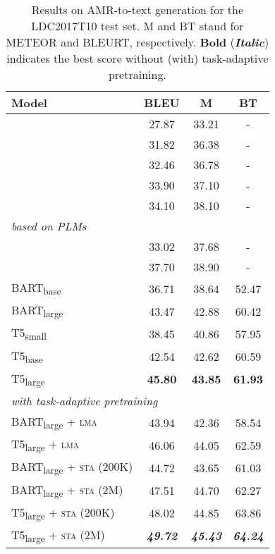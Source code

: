 \documentclass[11pt]{article}
\begin{document}
\begin{table}[t]
\centering
{\renewcommand{\arraystretch}{0.6}
\begin{tabular}{@{\hspace*{1mm}}l@{\hspace*{1mm}}ccc@{\hspace*{1mm}}}  
\toprule
\textbf{Model} & \textbf{BLEU} & \textbf{M} & \textbf{BT}  \\
\midrule
\citet{ribeiro-etal-2019-enhancing}  & 27.87 & 33.21 & -\\
\citet{zhu-etal-2019-modeling} & 31.82 & 36.38 & -\\
\citet{zhao-etal-2020-line} & 32.46 & 36.78 & -\\
\citet{doi:10.116200297} & 33.90 & 37.10 &  -\\
\citet{yao-etal-2020-heterogeneous}  & 34.10 & 38.10 & -\\
\midrule
\small{\textit{based on PLMs}} & & & \\[.2em]
\citet{mager2020gpttoo}  & 33.02 & 37.68 &  -\\
\citet{harkous2020text}  & 37.70 & 38.90 &-\\
\midrule
BART\textsubscript{base}  & 36.71 & 38.64 & 52.47 \\
BART\textsubscript{large}  & 43.47 & 42.88 &
60.42 \\
T5\textsubscript{small} & 38.45 & 40.86 & 57.95 \\
T5\textsubscript{base} & 42.54 & 42.62 & 60.59 \\
T5\textsubscript{large} & \textbf{45.80} & \textbf{43.85} & \textbf{61.93} \\
\midrule
\multicolumn{3}{l}{\small{\textit{with task-adaptive pretraining}}} & \\[.2em]
BART\textsubscript{large} + \textsc{lma} & 43.94 & 42.36 & 58.54 \\
T5\textsubscript{large} + \textsc{lma} & 46.06 & 44.05 & 62.59 \\[.7em]


BART\textsubscript{large} + \textsc{sta} \small{\textsc{(200K)}} & 44.72 & 43.65 & 61.03 \\
BART\textsubscript{large} + \textsc{sta} \small{\textsc{(2M)}} & 47.51 & 44.70 & 62.27 \\
T5\textsubscript{large} + \textsc{sta} \small{\textsc{(200K)}} & 48.02 & 44.85 & 63.86 \\
T5\textsubscript{large} + \textsc{sta} \small{\textsc{(2M)}} & \textbf{\textit{49.72}} & \textbf{\textit{45.43}} & \textbf{\textit{64.24}} \\
\bottomrule
\end{tabular}}
\vspace{-2mm}
\caption{Results on AMR-to-text generation for the LDC2017T10 test set. M and BT stand for METEOR and BLEURT, respectively. \textbf{Bold} (\textbf{\textit{Italic}}) indicates the best score without (with) task-adaptive pretraining.}
\label{tab:results-amr}
\vspace{-0.2cm}
\end{table}
\end{document}
